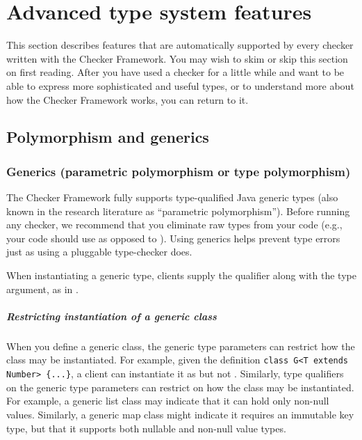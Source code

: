 \htmlhr
\chapter{Advanced type system features\label{advanced-type-system-features}}

This section describes features that are automatically supported by every
checker written with the Checker Framework.
You may wish to skim or skip this section on first reading.  After you have
used a checker for a little while and want to be able to express more
sophisticated and useful types, or to understand more about how the Checker
Framework works, you can return to it.


\section{Polymorphism and generics\label{polymorphism}}

\subsection{Generics (parametric polymorphism or type polymorphism)\label{generics}}

The Checker Framework fully supports
type-qualified Java generic types (also known in the research literature as ``parametric
polymorphism'').  Before running any checker, we recommend that you eliminate
raw types from your code (e.g., your code should use  as
opposed to ).
Using generics helps prevent type errors just as using a pluggable
type-checker does.

When instantiating a generic type,
clients supply the qualifier along with the type argument, as in
.


\paragraph{Restricting instantiation of a generic class}

When you define a generic class, the generic type parameters can restrict
how the class may be instantiated.  For example, given the definition
\verb|class G<T extends Number> {...}|,
a client can instantiate it as  but not .
Similarly, type qualifiers on the generic type parameters can restrict on
how the class may be instantiated.  For example, a generic list class may
indicate that it can hold only non-null values.  Similarly, a generic map
class might indicate it requires an immutable key type, but that it
supports both nullable and non-null value types.


